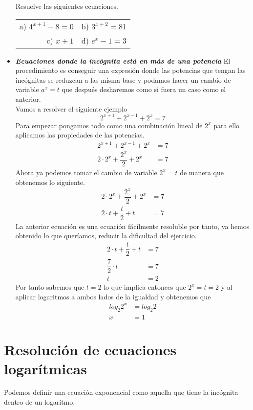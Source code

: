 \begin{itemize}
\begin{ejercicio}
Resuelve las siguientes ecuaciones. 
\\
\begin{tabular}{r l}
a) $4^{x+1}-8=0$ & b) $3^{x+2}=81$\\
c) $x+1$ & d) $e^x-1=3$
\end{tabular}
\end{ejercicio}
\newpage 
\item \textbf{\textit{Ecuaciones donde la incógnita está en más de una potencia}}
El procedimiento es conseguir una expresión donde las potencias que tengan las incógnitas se reduzcan a las misma base y podamos hacer un cambio de variable $a^x=t$ que después desharemos como si fuera un caso como el anterior. 
\\
Vamos a resolver el siguiente ejemplo
\begin{equation*}
2^{x+1}+2^{x-1}+2^x=7
\end{equation*}
Para empezar pongamos todo como una combinación lineal de $2^x$ para ello aplicamos las propiedades de las potencias. 
\begin{align*}
2^{x+1}+2^{x-1}+2^x &=7\\
2\cdot 2^x+\dfrac{2^x}{2}+2^x&=7
\end{align*}
Ahora ya podemos tomar el cambio de variable $2^x=t$ de manera que obtenemos lo siguiente. 
\begin{align*}
2\cdot 2^x+\dfrac{2^x}{2}+2^x&=7\\
2\cdot t+\dfrac{t}{2}+t &=7
\end{align*}
La anterior ecuación es una ecuación fácilmente resoluble por tanto, ya hemos obtenido lo que queríamos, reducir la dificultad del ejercicio. 
\begin{align*}
2\cdot t+\dfrac{t}{2}+t &=7\\
\dfrac{7}{2}\cdot t &=7\\
t&=2
\end{align*}
Por tanto sabemos que $t=2$ lo que implica entonces que $2^x=t=2$ y  al aplicar logaritmos a ambos lados de la igualdad y obtenemos que \begin{align*}
log_2 2^x&=log_2 2\\
x &=1
\end{align*}

\end{itemize}
\newpage
\section{Resolución de ecuaciones logarítmicas}
\begin{defi}
Podemos definir una ecuación exponencial como aquella que tiene la incógnita dentro de un logaritmo.
\end{defi}



